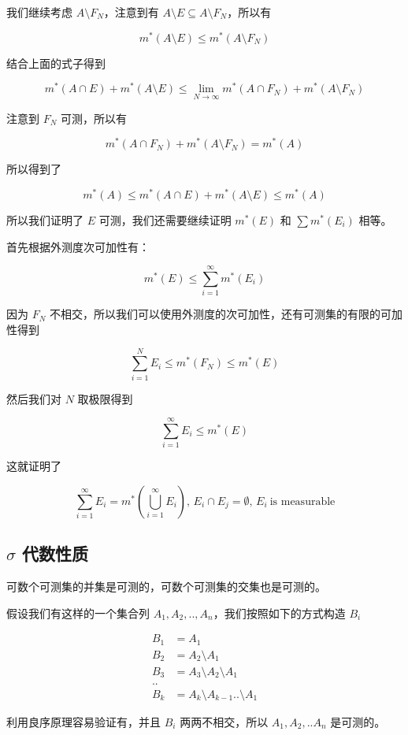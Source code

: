 我们继续考虑 $A \setminus F_N$，注意到有 $A \setminus E \subseteq A \setminus F_N$，所以有

\[
m^*(A \setminus E) \le m^*(A \setminus F_N)
\]

结合上面的式子得到

\[
m^*(A \cap E) + m^*(A \setminus E) \le \lim_{N \to \infty}m^*(A \cap F_N) + m^*(A \setminus F_N)
\]

注意到 $F_N$ 可测，所以有

\[
m^*(A \cap F_N) + m^*(A \setminus F_N) = m^*(A)
\]

所以得到了

\[
m^*(A) \le m^*(A \cap E) + m^*(A \setminus E) \le m^*(A)
\]

所以我们证明了 $E$ 可测，我们还需要继续证明 $m^*(E)$ 和 $\sum m^*(E_i)$ 相等。

首先根据外测度次可加性有：

\[
m^*(E) \le \sum_{i=1}^{\infty}m^*(E_i)
\]

因为 $F_N$ 不相交，所以我们可以使用外测度的次可加性，还有可测集的有限的可加性得到

\[
\sum_{i=1}^{N}E_i \le m^*(F_N) \le m^*(E)
\]

然后我们对 $N$ 取极限得到

\[
\sum_{i=1}^{\infty}E_i \le m^*(E)
\]

这就证明了

\[
\sum_{i=1}^{\infty}E_i = m^*(\bigcup_{i=1}^{\infty}E_i) ,\, E_i \cap E_j = \emptyset ,\, E_i \:\text{is measurable}
\]

\subsection{$\sigma$ 代数性质}

可数个可测集的并集是可测的，可数个可测集的交集也是可测的。

假设我们有这样的一个集合列 $A_1, A_2, .., A_n$，我们按照如下的方式构造 $B_i$

\begin{align*}
    B_1 &= A_1 \\
    B_2 &= A_2 \setminus A_1 \\
    B_3 &= A_3 \setminus A_2 \setminus A_1 \\
    .. & \\
    B_k &= A_k \setminus A_{k-1} .. \setminus A_1
\end{align*}

利用良序原理容易验证有，并且 $B_i$ 两两不相交，所以 $A_1, A_2, .. A_n$ 是可测的。

